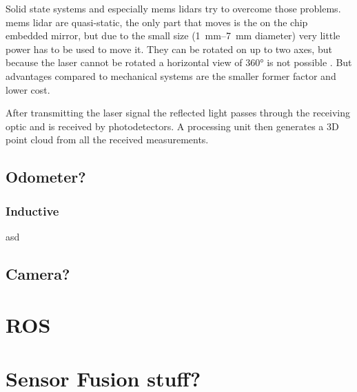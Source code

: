 Solid state systems and especially \gls{mems} \gls{lidar}s try to overcome those problems.
\gls{mems} \gls{lidar} are quasi-static, the only part that moves is the on the chip embedded mirror, but due to the small size (\SIrange{1}{7}{\milli\metre} diameter) very little power has to be used to move it.
They can be rotated on up to two axes, but because the laser cannot be rotated a horizontal view of 360° is not possible .
But advantages compared to mechanical systems are the smaller former factor and lower cost.

After transmitting the laser signal the reflected light passes through the receiving optic and is received by photodetectors.
A processing unit then generates a 3D point cloud from all the received measurements.
\cite{Wang2020}
\cite{Vaughan2006}


\subsection{Odometer?}
\subsubsection{Inductive}
asd


\subsection{Camera?}



\section{ROS}



\section{Sensor Fusion stuff?}



